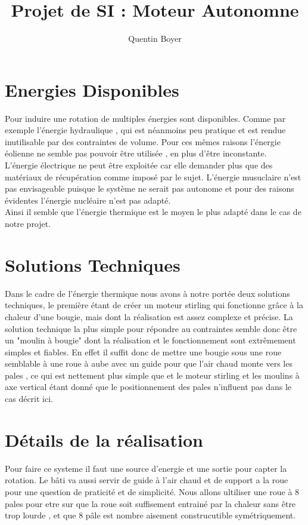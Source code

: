 \documentclass[a4paper,12pt]{article}
\title{Projet de SI : Moteur Autonomne}
\author{Quentin Boyer}
\begin{document}
\maketitle
\tableofcontents

\section{Energies Disponibles}

\indent Pour induire une rotation de multiples énergies sont disponibles. Comme par exemple l'énergie hydraulique , qui est néanmoins peu pratique et est rendue inutilisable par des contraintes de volume. Pour ces mêmes raisons l'énergie éolienne ne semble pas pouvoir être utilisée , en plus d'être inconstante.\\[0.3cm]
\indent L'énergie électrique ne peut être exploitée car elle demander plus que des matériaux de récupération comme imposé par le sujet. L'énergie musuclaire n'est pas envisageable puisque le système ne serait pas autonome et pour des raisons évidentes l'énergie nucléaire n'est pas adapté.\\[0.3cm]
\indent Ainsi il semble que l'énergie thermique est le moyen le plus adapté dans le cas de notre projet.\\[0.05cm]

\pagebreak

\section{Solutions Techniques}
Dans le cadre de l'énergie thermique nous avons à notre portée deux solutions techniques, le première étant de créer un moteur stirling qui fonctionne grâce à la chaleur d'une bougie, mais dont la réalisation est assez complexe et précise. La solution technique la plus simple pour répondre au contraintes semble donc être un "moulin à bougie" dont la réalisation et le fonctionnement sont extrêmement simples et fiables. En effet il suffit donc de mettre une bougie sous une roue semblable à une roue à aube avec un guide pour que l'air chaud monte vers les pales , ce qui est nettement plus simple que et le moteur stirling et les moulins à axe vertical étant donné que le positionnement des pales n'influent pas dans le cas décrit ici.

  \section{Détails de la réalisation}
  Pour faire ce systeme il faut une source d'energie et une sortie pour capter la rotation. Le bâti va aussi servir de guide à l'air chaud et de support a la roue pour une question de praticité et de simplicité. Nous allons ultiliser une roue à 8 pales pour etre sur que la roue soit suffisement entrainé par la chaleur sans être trop lourde , et que 8 pâle est nombre aisement construcutible symétriquement.
\end{document}
